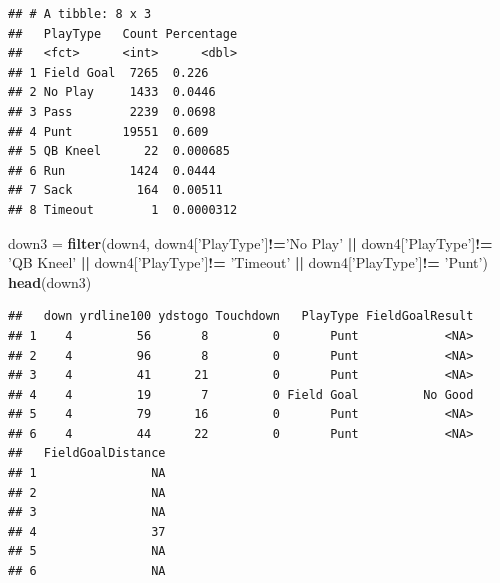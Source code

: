 \documentclass[]{article}
\newenvironment{Shaded}{\begin{snugshade}}{\end{snugshade}}
\newcommand{\KeywordTok}[1]{\textcolor[rgb]{0.13,0.29,0.53}{\textbf{#1}}}
\newcommand{\NormalTok}[1]{#1}
\newcommand{\OperatorTok}[1]{\textcolor[rgb]{0.81,0.36,0.00}{\textbf{#1}}}
\newcommand{\StringTok}[1]{\textcolor[rgb]{0.31,0.60,0.02}{#1}}
\begin{document}
\begin{verbatim}
## # A tibble: 8 x 3
##   PlayType   Count Percentage
##   <fct>      <int>      <dbl>
## 1 Field Goal  7265  0.226    
## 2 No Play     1433  0.0446   
## 3 Pass        2239  0.0698   
## 4 Punt       19551  0.609    
## 5 QB Kneel      22  0.000685 
## 6 Run         1424  0.0444   
## 7 Sack         164  0.00511  
## 8 Timeout        1  0.0000312
\end{verbatim}

\begin{Shaded}
\begin{Highlighting}[]
\NormalTok{down3 =}\StringTok{ }\KeywordTok{filter}\NormalTok{(down4, down4[}\StringTok{'PlayType'}\NormalTok{]}\OperatorTok{!=}\StringTok{'No Play'} \OperatorTok{||}\StringTok{ }\NormalTok{down4[}\StringTok{'PlayType'}\NormalTok{]}\OperatorTok{!=}\StringTok{ 'QB Kneel'} \OperatorTok{||}\StringTok{ }\NormalTok{down4[}\StringTok{'PlayType'}\NormalTok{]}\OperatorTok{!=}\StringTok{ 'Timeout'} \OperatorTok{||}\StringTok{ }\NormalTok{down4[}\StringTok{'PlayType'}\NormalTok{]}\OperatorTok{!=}\StringTok{ 'Punt'}\NormalTok{)}
\KeywordTok{head}\NormalTok{(down3)}
\end{Highlighting}
\end{Shaded}

\begin{verbatim}
##   down yrdline100 ydstogo Touchdown   PlayType FieldGoalResult
## 1    4         56       8         0       Punt            <NA>
## 2    4         96       8         0       Punt            <NA>
## 3    4         41      21         0       Punt            <NA>
## 4    4         19       7         0 Field Goal         No Good
## 5    4         79      16         0       Punt            <NA>
## 6    4         44      22         0       Punt            <NA>
##   FieldGoalDistance
## 1                NA
## 2                NA
## 3                NA
## 4                37
## 5                NA
## 6                NA
\end{verbatim}
\end{document}
